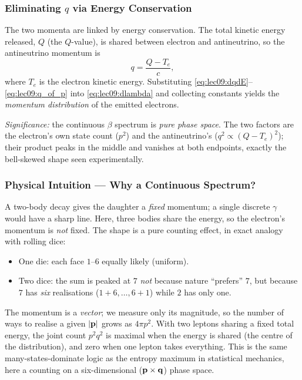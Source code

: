 \subsubsection*{Eliminating $q$ via Energy Conservation}
The two momenta are linked by energy conservation. The total kinetic energy
released, $Q$ (the $Q$-value), is shared between electron and antineutrino, so the
antineutrino momentum is
\begin{equation}
  \label{eq:lec09:q_of_p}
  \boxed{q = \frac{Q - T_e}{c},}
\end{equation}
where $T_e$ is the electron kinetic energy. Substituting
\eqref{eq:lec09:dqdE}--\eqref{eq:lec09:q_of_p} into \eqref{eq:lec09:dlambda} and
collecting constants yields the \emph{momentum distribution} of the emitted
electrons.

\textit{Significance:} the continuous $\beta$ spectrum is \emph{pure phase space}.
The two factors are the electron's own state count ($p^2$) and the antineutrino's
($q^2\propto(Q-T_e)^2$); their product peaks in the middle and vanishes at both
endpoints, exactly the bell-skewed shape seen experimentally.

\subsubsection*{Physical Intuition --- Why a Continuous Spectrum?}
A two-body decay gives the daughter a \emph{fixed} momentum; a single discrete
$\gamma$ would have a sharp line. Here, three bodies share the energy, so the
electron's momentum is \emph{not} fixed. The shape is a pure counting effect, in
exact analogy with rolling dice:
\begin{itemize}[nosep]
  \item One die: each face $1$--$6$ equally likely (uniform).
  \item Two dice: the sum is peaked at $7$ \emph{not} because nature ``prefers''
        $7$, but because $7$ has \emph{six} realisations
        ($1\!+\!6,\dots,6\!+\!1$) while $2$ has only one.
\end{itemize}
The momentum is a \emph{vector}; we measure only its magnitude, so the number of
ways to realise a given $|\mathbf{p}|$ grows as $4\pi p^2$. With two leptons sharing
a fixed total energy, the joint count $p^2q^2$ is maximal when the energy is
shared (the centre of the distribution), and zero when one lepton takes
everything. This is the same many-states-dominate logic as the entropy maximum in
statistical mechanics, here a counting on a six-dimensional ($\mathbf{p}\times\mathbf{q}$) phase space.

